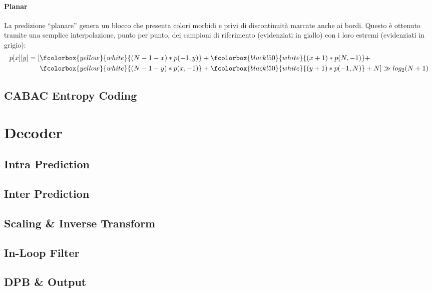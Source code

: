 \paragraph*{Planar} La predizione ``planare'' genera un blocco che presenta 
colori morbidi e privi di discontinuità marcate anche ai bordi. Questo è 
ottenuto tramite una semplice interpolazione, punto per punto, dei campioni di 
riferimento (evidenziati in giallo) con i loro estremi (evidenziati in grigio):
\begin{align*}
p[x][y] = 
[&\fcolorbox{yellow}{white}{(N-1-x)*p(-1,y)}+
  \fcolorbox{black!50}{white}{(x+1)*p(N,-1)}+\\
 &\fcolorbox{yellow}{white}{(N-1-y)*p(x,-1)}+
  \fcolorbox{black!50}{white}{(y+1)*p(-1,N)}+N] \gg log_2(N+1)
\end{align*} 

\subsection{CABAC Entropy Coding}


\section{Decoder}


\subsection{Intra Prediction}


\subsection{Inter Prediction}


\subsection{Scaling \& Inverse Transform}


\subsection{In-Loop Filter}


\subsection{DPB \& Output}
